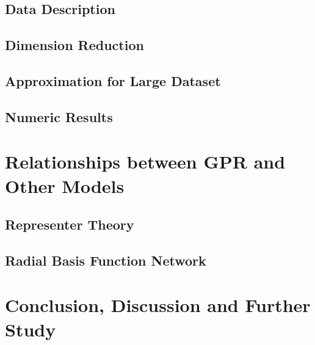 \documentclass[[11pt,twoside,a4paper]{article}
\theoremstyle{definition}
\numberwithin{equation}{section}
\begin{document}
\subsection{Data Description}

\subsection{Dimension Reduction}

\subsection{Approximation for Large Dataset}

\subsection{Numeric Results}

\newpage
\section{Relationships between GPR and Other Models}

\subsection{Representer Theory}

\subsection{Radial Basis Function Network}

\newpage
\section{Conclusion, Discussion and Further Study}
\end{document}
